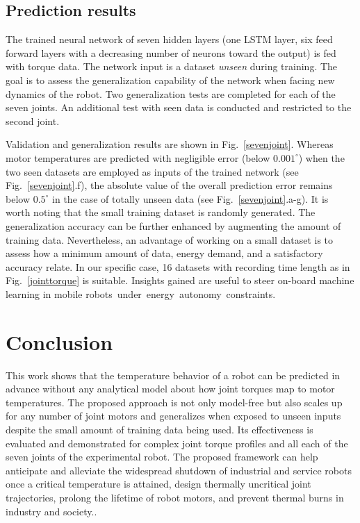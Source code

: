 \documentclass{ifacconf}
\begin{document}
\subsection{Prediction results}
The trained neural network of seven hidden layers (one LSTM layer, six feed forward  layers with a decreasing number of neurons toward the output) is fed with torque data. The network input is a  dataset \textit{unseen} during training.  The goal is to  assess the generalization capability of the network when facing new dynamics of the robot. Two generalization tests are completed for each of the seven joints.  An additional test with seen data is conducted and restricted to the second joint.

Validation and generalization results are shown in Fig.~\ref{sevenjoint}. Whereas motor temperatures are predicted with negligible error (below $0.001^\circ$) when the two seen  datasets are employed as inputs of the trained network (see Fig.~\ref{sevenjoint}.f), the absolute value of the overall prediction error remains below $0.5^\circ$ in the case of totally unseen data (see  Fig.~\ref{sevenjoint}.a-g). It is worth noting that the small training dataset is randomly generated. The generalization accuracy can be further enhanced by augmenting the amount of training data. Nevertheless, an advantage of working on a small dataset is to assess how a minimum amount of data, energy demand, and a satisfactory accuracy relate. In our specific case, 16 datasets with recording time length as in Fig.~\ref{jointtorque} is suitable. Insights gained are useful to steer on-board machine learning in  mobile \mbox{robots under energy autonomy constraints.}








\section{Conclusion}
This work shows that the temperature behavior of a robot can be predicted in advance without any analytical  model about how joint torques map to motor temperatures. The proposed approach is not only model-free but also scales up for any number of joint motors and generalizes when exposed to  unseen inputs despite the small amount of training data being used. Its effectiveness is evaluated and demonstrated for complex joint torque profiles and all each of the seven joints of the experimental robot. The proposed framework can help anticipate and alleviate the widespread shutdown  of industrial and service robots once a critical temperature  is attained, design thermally uncritical joint trajectories, prolong the lifetime of robot motors, and prevent thermal burns in industry and society..
\end{document}
